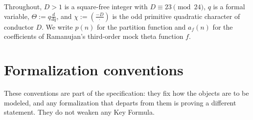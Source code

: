 \documentclass[11pt]{article}
\newcommand{\leg}[2]{\left(\frac{#1}{#2}\right)}
\theoremstyle{definition}
\begin{document}
Throughout, $D>1$ is a square-free integer with $D\equiv23\pmod{24}$, $q$ is a formal variable,
$\Theta:=q\frac{d}{dq}$, and $\chi:=\leg{-D}{\cdot}$ is the odd primitive quadratic character of
conductor $D$. We write $p(n)$ for the partition function and $a_f(n)$ for the coefficients of
Ramanujan's third-order mock theta function $f$.

\section*{Formalization conventions}

These conventions are part of the specification: they fix how the objects are to be modeled, and
any formalization that departs from them is proving a different statement. They do not weaken any
Key Formula.
\end{document}
